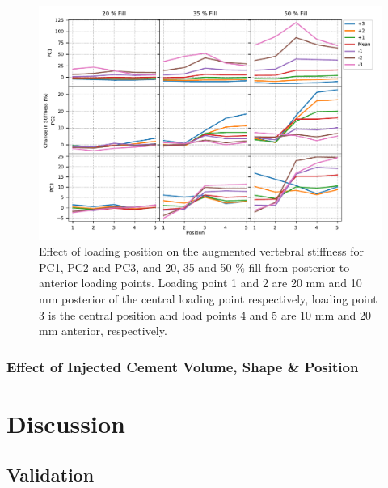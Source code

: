 \begin{figure}[p]
  \centering
  \includegraphics[width=.9\textheight, angle=90]{Chapters/Chapter_PCA_images/AP_change_from_non_aug.pdf}
  \caption[Effect of loading position on the augmented vertebral
	stiffness.]{Effect of loading position on the augmented vertebral
	stiffness for PC1, PC2 and PC3, and 20, 35 and 50 \% fill from
	posterior to anterior loading points. Loading point 1 and 2 are 20 mm
	and 10 mm posterior of the central loading point respectively, loading
	point 3 is the central position and load points 4 and 5 are 10 mm and
	20 mm anterior, respectively. }
  \label{fig:AP_change_from_non_aug}
\end{figure}
	
\subsubsection{Effect of Injected Cement Volume, Shape \& Position}		


\pagebreak


\section{Discussion} \label{pca_disc}

\subsection{Validation}

